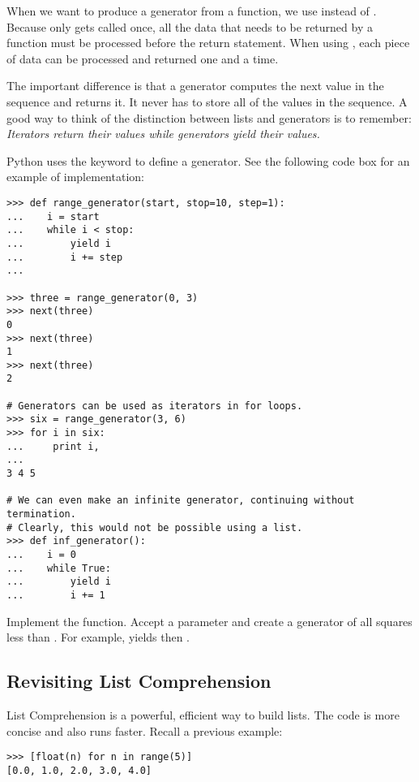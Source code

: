 When we want to produce a generator from a function, we use  instead of . Because  only gets called once, all the data that needs to be returned by a function must be processed before the return statement. When using , each piece of data can be processed and returned one and a time.

The important difference is that a generator computes the next value in the sequence and returns it. It never has to store all of the values in the sequence. A good way to think of the distinction between lists and generators is to remember: \emph{Iterators return their values while generators yield their values.}

Python uses the  keyword to define a generator. See the following code box for an example of implementation:
\begin{lstlisting}
>>> def range_generator(start, stop=10, step=1):
...    i = start
...    while i < stop:
...        yield i 
...        i += step
...

>>> three = range_generator(0, 3)
>>> next(three)
0
>>> next(three)
1
>>> next(three)
2

# Generators can be used as iterators in for loops.
>>> six = range_generator(3, 6)
>>> for i in six:
...     print i,
...
3 4 5

# We can even make an infinite generator, continuing without termination.
# Clearly, this would not be possible using a list.
>>> def inf_generator():
...    i = 0
...    while True:
...        yield i
...        i += 1
\end{lstlisting}

\begin{problem}
Implement the  function.
Accept a parameter  and create a generator of all squares less than .
For example,  yields  then .
\end{problem}


\subsection*{Revisiting List Comprehension}
List Comprehension is a powerful, efficient way to build lists.
The code is more concise and also runs faster.
Recall a previous example:
\begin{lstlisting}
>>> [float(n) for n in range(5)]
[0.0, 1.0, 2.0, 3.0, 4.0]
\end{lstlisting}

